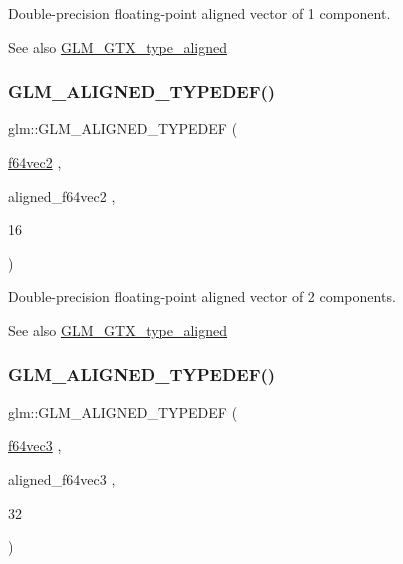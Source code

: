 Double-\/precision floating-\/point aligned vector of 1 component. \begin{DoxySeeAlso}{See also}
\mbox{\hyperlink{group__gtx__type__aligned}{G\+L\+M\+\_\+\+G\+T\+X\+\_\+type\+\_\+aligned}} 
\end{DoxySeeAlso}
\mbox{\label{group__gtx__type__aligned_ga32814aa0f19316b43134fc25f2aad2b9}} 
\subsubsection{\texorpdfstring{GLM\_ALIGNED\_TYPEDEF()}{GLM\_ALIGNED\_TYPEDEF()}\hspace{0.1cm}{\footnotesize\ttfamily [160/209]}}
{\footnotesize\ttfamily glm\+::\+G\+L\+M\+\_\+\+A\+L\+I\+G\+N\+E\+D\+\_\+\+T\+Y\+P\+E\+D\+EF (\begin{DoxyParamCaption}\item[{\mbox{\hyperlink{group__gtc__type__precision_gacde4fe7b129521888cd30672c34650c5}{f64vec2}}}]{,  }\item[{aligned\+\_\+f64vec2}]{,  }\item[{16}]{ }\end{DoxyParamCaption})}

Double-\/precision floating-\/point aligned vector of 2 components. \begin{DoxySeeAlso}{See also}
\mbox{\hyperlink{group__gtx__type__aligned}{G\+L\+M\+\_\+\+G\+T\+X\+\_\+type\+\_\+aligned}} 
\end{DoxySeeAlso}
\mbox{\label{group__gtx__type__aligned_gaf3d3bbc1e93909b689123b085e177a14}} 
\subsubsection{\texorpdfstring{GLM\_ALIGNED\_TYPEDEF()}{GLM\_ALIGNED\_TYPEDEF()}\hspace{0.1cm}{\footnotesize\ttfamily [161/209]}}
{\footnotesize\ttfamily glm\+::\+G\+L\+M\+\_\+\+A\+L\+I\+G\+N\+E\+D\+\_\+\+T\+Y\+P\+E\+D\+EF (\begin{DoxyParamCaption}\item[{\mbox{\hyperlink{group__gtc__type__precision_gac531875c6544b7919f36a86cbe538736}{f64vec3}}}]{,  }\item[{aligned\+\_\+f64vec3}]{,  }\item[{32}]{ }\end{DoxyParamCaption})}

